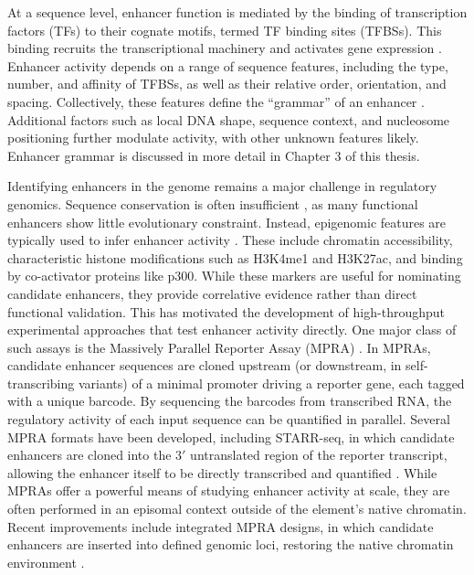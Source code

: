\begin{dissertationintroduction}
At a sequence level, enhancer function is mediated by the binding of transcription factors (TFs) to their cognate motifs, termed TF binding sites (TFBSs). This binding recruits the transcriptional machinery and activates gene expression \cite{Malik2023-sk}. Enhancer activity depends on a range of sequence features, including the type, number, and affinity of TFBSs, as well as their relative order, orientation, and spacing. Collectively, these features define the “grammar” of an enhancer \cite{Jindal2021-zk}. Additional factors such as local DNA shape, sequence context, and nucleosome positioning further modulate activity, with other unknown features likely. Enhancer grammar is discussed in more detail in Chapter 3 of this thesis.

Identifying enhancers in the genome remains a major challenge in regulatory genomics. Sequence conservation is often insufficient \cite{Farley2015-xx,noauthor_2023-un}, as many functional enhancers show little evolutionary constraint. Instead, epigenomic features are typically used to infer enhancer activity \cite{Shlyueva2014-nr}. These include chromatin accessibility, characteristic histone modifications such as H3K4me1 and H3K27ac, and binding by co-activator proteins like p300. While these markers are useful for nominating candidate enhancers, they provide correlative evidence rather than direct functional validation. This has motivated the development of high-throughput experimental approaches that test enhancer activity directly. One major class of such assays is the Massively Parallel Reporter Assay (MPRA) \cite{Inoue2015-yy,LeProust2010-nr}. In MPRAs, candidate enhancer sequences are cloned upstream (or downstream, in self-transcribing variants) of a minimal promoter driving a reporter gene, each tagged with a unique barcode. By sequencing the barcodes from transcribed RNA, the regulatory activity of each input sequence can be quantified in parallel. Several MPRA formats have been developed, including STARR-seq, in which candidate enhancers are cloned into the $3'$ untranslated region of the reporter transcript, allowing the enhancer itself to be directly transcribed and quantified \cite{Arnold2013-bk}. While MPRAs offer a powerful means of studying enhancer activity at scale, they are often performed in an episomal context outside of the element’s native chromatin. Recent improvements include integrated MPRA designs, in which candidate enhancers are inserted into defined genomic loci, restoring the native chromatin environment \cite{Inoue2017-hm}.


\end{dissertationintroduction}
